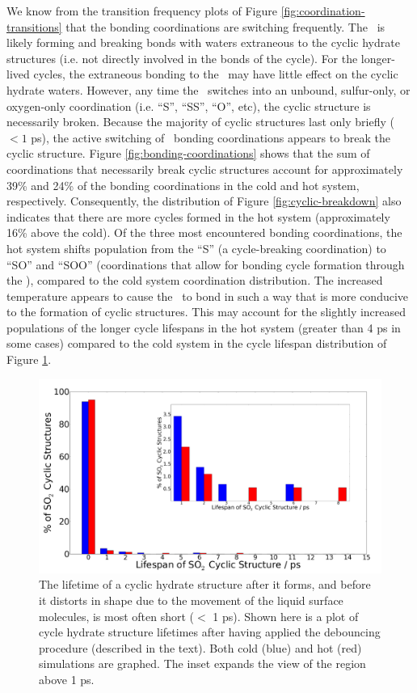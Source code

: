 We know from the transition frequency plots of Figure \ref{fig:coordination-transitions} that the bonding coordinations are switching frequently. The \suldiox~is likely forming and breaking bonds with waters extraneous to the cyclic hydrate structures (i.e. not directly involved in the bonds of the cycle). For the longer-lived cycles, the extraneous bonding to the \suldiox~may have little effect on the cyclic hydrate waters. However, any time the \suldiox~switches into an unbound, sulfur-only, or oxygen-only coordination (i.e. ``S'', ``SS'', ``O'', etc), the cyclic structure is necessarily broken. Because the majority of cyclic structures last only briefly ($<1$ ps), the active switching of \suldiox~bonding coordinations appears to break the cyclic structure. Figure \ref{fig:bonding-coordinations} shows that the sum of coordinations that necessarily break cyclic structures account for approximately 39\% and 24\% of the bonding coordinations in the cold and hot system, respectively. Consequently, the distribution of Figure \ref{fig:cyclic-breakdown} also indicates that there are more cycles formed in the hot system (approximately 16\% above the cold). Of the three most encountered bonding coordinations, the hot system shifts population from the ``S'' (a cycle-breaking coordination) to ``SO'' and ``SOO'' (coordinations that allow for bonding cycle formation through the \suldiox), compared to the cold system coordination distribution. The increased temperature appears to cause the \suldiox~to bond in such a way that is more conducive to the formation of cyclic structures. This may account for the slightly increased populations of the longer cycle lifespans in the hot system (greater than 4 ps in some cases) compared to the cold system in the cycle lifespan distribution of Figure \ref{fig:cycle-lifespans}. 

\begin{figure}[h!]
	\begin{center}
		\includegraphics[scale=1.0]{images/cycles/cyclic-lifespans-inset-small.png}
		\caption{The lifetime of a cyclic hydrate structure after it forms, and before it distorts in shape due to the movement of the liquid surface molecules, is most often short ($<$ 1 ps). Shown here is a plot of cycle hydrate structure lifetimes after having applied the debouncing procedure (described in the text). Both cold (blue) and hot (red) simulations are graphed. The inset expands the view of the region above 1 ps.}
		\label{fig:cycle-lifespans}
	\end{center}
\end{figure}
